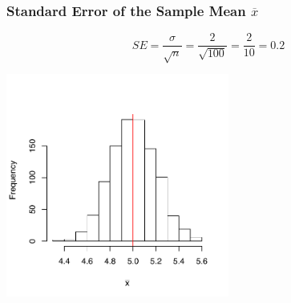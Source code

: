 \documentclass[handout]{beamer}
\newcommand{\xbar}{\overline{x}}
\begin{document}
\begin{frame}[fragile]
\frametitle{Standard Error of the Sample Mean $\xbar$}

\[
SE = \frac{\sigma}{\sqrt{n}} = \frac{2}{\sqrt{100}} = \frac{2}{10} = 0.2
\]
\begin{center}
\includegraphics[width=0.55\textwidth]{figure/lec12-001}
\end{center}


\end{frame}
\end{document}
